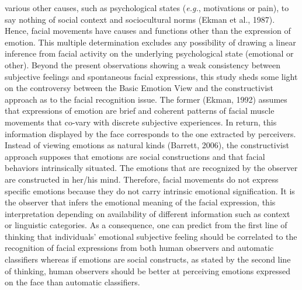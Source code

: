 \documentclass[
  english,
  doc]{apa7}
\begin{document}
various other causes, such as psychological states (\emph{e.g.}, motivations or pain), to say nothing of social context and sociocultural norms (Ekman et al., 1987). Hence, facial movements have causes and functions other than the expression of emotion. This multiple determination excludes any possibility of drawing a linear inference from facial activity on the underlying psychological state (emotional or other). Beyond the present observations showing a weak consistency between subjective feelings and spontaneous facial expressions, this study sheds some light on the controversy between the Basic Emotion View and the constructivist approach as to the facial recognition issue. The former (Ekman, 1992) assumes that expressions of emotion are brief and coherent patterns of facial muscle movements that co-vary with discrete subjective experiences. In return, this information displayed by the face corresponds to the one extracted by perceivers. Instead of viewing emotions as natural kinds (Barrett, 2006), the constructivist approach supposes that emotions are social constructions and that facial behaviors intrinsically situated. The emotions that are recognized by the observer are constructed in her/his mind. Therefore, facial movements do not express specific emotions because they do not carry intrinsic emotional signification. It is the observer that infers the emotional meaning of the facial expression, this interpretation depending on availability of different information such as context or linguistic categories. As a consequence, one can predict from the first line of thinking that individuals' emotional subjective feeling should be correlated to the recognition of facial expressions from both human observers and automatic classifiers whereas if emotions are social constructs, as stated by the second line of thinking, human observers should be better at perceiving emotions expressed on the face than automatic classifiers.
\end{document}
